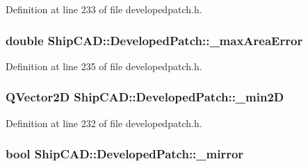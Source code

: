 Definition at line 233 of file developedpatch.\+h.

\subsubsection[{\texorpdfstring{\+\_\+max\+Area\+Error}{_maxAreaError}}]{\setlength{\rightskip}{0pt plus 5cm}double Ship\+C\+A\+D\+::\+Developed\+Patch\+::\+\_\+max\+Area\+Error\hspace{0.3cm}{\ttfamily [protected]}}\hypertarget{classShipCAD_1_1DevelopedPatch_af180b25af9b064398ad1c08747589d78}{}\label{classShipCAD_1_1DevelopedPatch_af180b25af9b064398ad1c08747589d78}


Definition at line 235 of file developedpatch.\+h.

\subsubsection[{\texorpdfstring{\+\_\+min2D}{_min2D}}]{\setlength{\rightskip}{0pt plus 5cm}Q\+Vector2D Ship\+C\+A\+D\+::\+Developed\+Patch\+::\+\_\+min2D\hspace{0.3cm}{\ttfamily [protected]}}\hypertarget{classShipCAD_1_1DevelopedPatch_a7fe7981020e5078148b87c9b0bab9075}{}\label{classShipCAD_1_1DevelopedPatch_a7fe7981020e5078148b87c9b0bab9075}


Definition at line 232 of file developedpatch.\+h.

\subsubsection[{\texorpdfstring{\+\_\+mirror}{_mirror}}]{\setlength{\rightskip}{0pt plus 5cm}bool Ship\+C\+A\+D\+::\+Developed\+Patch\+::\+\_\+mirror\hspace{0.3cm}{\ttfamily [protected]}}\hypertarget{classShipCAD_1_1DevelopedPatch_add1e0f68f33725c24a71bbd46e13820b}{}\label{classShipCAD_1_1DevelopedPatch_add1e0f68f33725c24a71bbd46e13820b}


